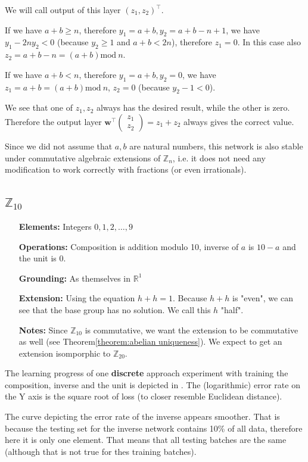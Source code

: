 We will call output of this layer $(z_1,z_2)^\top$. 

If we have $a+b\geq n$, therefore $y_1=a+b, y_2=a+b-n+1$, we have $y_1-2ny_2<0$ (because $y_2\geq 1$ and $a+b<2n$), therefore $z_1=0$. In this case also $z_2=a+b-n=(a+b)\text{mod}\ n$.

If we have $a+b< n$, therefore $y_1=a+b,y_2=0$, we have $z_1=a+b=(a+b)\text{mod}\ n$, $z_2=0$ (because $y_2-1<0$).

We see that one of $z_1,z_2$ always has the desired result, while the other is zero. Therefore the output layer $\textbf{w}^\top \left(\begin{matrix}
z_1\\
z_2
\end{matrix}\right)=z_1+z_2$ always gives the correct value.

Since we did not assume that $a,b$ are natural numbers, this network is also stable under commutative algebraic extensions of $\mathbb{Z}_n$, i.e. it does not need any modification to work correctly with fractions (or even irrationals).
\subsection{$\mathbb{Z}_{10}$}

\begin{itemize}
	\item[\textbf{Elements:}] Integers $0,1,2,\dots,9$
	\item[\textbf{Operations:}] Composition is addition modulo 10, inverse of $a$ is $10-a$ and the unit is 0.
	\item[\textbf{Grounding:}] As themselves in $\mathbb{R}^1$
	\item[\textbf{Extension:}] Using the equation $h+h=1$. Because $h+h$ is "even", we can see that the base group has no solution. We call this $h$ "half".
	\item[\textbf{Notes:}] Since $\mathbb{Z}_{10}$ is commutative, we want the extension to be commutative as well (see Theorem\autoref{theorem:abelian uniqueness}). We expect to get an extension isomporphic to $\mathbb{Z}_{20}$.
\end{itemize}

The learning progress of one \textbf{discrete} approach experiment with training the composition, inverse and the unit is depicted in . The (logarithmic) error rate on the Y axis is the square root of loss (to closer resemble Euclidean distance).

The curve depicting the error rate of the inverse appears smoother. That is because the testing set for the inverse network contains 10\% of all data, therefore here it is only one element. That means that all testing batches are the same (although that is not true for thes training batches).

